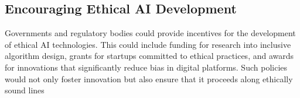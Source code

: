 \subsection{Encouraging Ethical AI Development}
Governments and regulatory bodies could provide incentives for the development of ethical AI technologies. This could include funding for research into inclusive algorithm design, grants for startups committed to ethical practices, and awards for innovations that significantly reduce bias in digital platforms. Such policies would not only foster innovation but also ensure that it proceeds along ethically sound lines \cite{Crawford}



